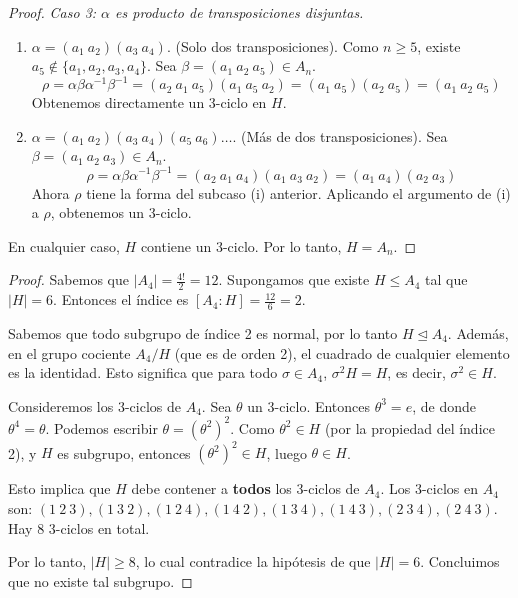 \begin{proof}
    \textit{Caso 3: $\alpha$ es producto de transposiciones disjuntas.}
    \begin{enumerate}
        \item[i)] $\alpha = (a_1 \ a_2)(a_3 \ a_4)$. (Solo dos transposiciones).
        Como $n \ge 5$, existe $a_5 \notin \{a_1, a_2, a_3, a_4\}$.
        Sea $\beta = (a_1 \ a_2 \ a_5) \in A_n$.
        \begin{equation*}
            \rho = \alpha \beta \alpha^{-1} \beta^{-1} = (a_2 \ a_1 \ a_5)(a_1 \ a_5 \ a_2) = (a_1 \ a_5)(a_2 \ a_5) = (a_1 \ a_2 \ a_5)
        \end{equation*}
        Obtenemos directamente un 3-ciclo en $H$.

        \item[ii)] $\alpha = (a_1 \ a_2)(a_3 \ a_4)(a_5 \ a_6) \dots$. (Más de dos transposiciones).
        Sea $\beta = (a_1 \ a_2 \ a_3) \in A_n$.
        \begin{equation*}
            \rho = \alpha \beta \alpha^{-1} \beta^{-1} = (a_2 \ a_1 \ a_4)(a_1 \ a_3 \ a_2) = (a_1 \ a_4)(a_2 \ a_3)
        \end{equation*}
        Ahora $\rho$ tiene la forma del subcaso (i) anterior. Aplicando el argumento de (i) a $\rho$, obtenemos un 3-ciclo.
    \end{enumerate}

    En cualquier caso, $H$ contiene un 3-ciclo. Por lo tanto, $H = A_n$.
\end{proof}


\begin{proof}
    Sabemos que $|A_4| = \frac{4!}{2} = 12$.
    Supongamos que existe $H \leq A_4$ tal que $|H| = 6$.
    Entonces el índice es $[A_4 : H] = \frac{12}{6} = 2$.
    
    Sabemos que todo subgrupo de índice 2 es normal, por lo tanto $H \trianglelefteq A_4$.
    Además, en el grupo cociente $A_4/H$ (que es de orden 2), el cuadrado de cualquier elemento es la identidad. Esto significa que para todo $\sigma \in A_4$, $\sigma^2 H = H$, es decir, $\sigma^2 \in H$.
    
    Consideremos los 3-ciclos de $A_4$. Sea $\theta$ un 3-ciclo.
    Entonces $\theta^3 = e$, de donde $\theta^4 = \theta$.
    Podemos escribir $\theta = (\theta^2)^2$.
    Como $\theta^2 \in H$ (por la propiedad del índice 2), y $H$ es subgrupo, entonces $(\theta^2)^2 \in H$, luego $\theta \in H$.
    
    Esto implica que $H$ debe contener a \textbf{todos} los 3-ciclos de $A_4$.
    Los 3-ciclos en $A_4$ son:
    $(1 \ 2 \ 3), (1 \ 3 \ 2), (1 \ 2 \ 4), (1 \ 4 \ 2), (1 \ 3 \ 4), (1 \ 4 \ 3), (2 \ 3 \ 4), (2 \ 4 \ 3)$.
    Hay 8 3-ciclos en total.
    
    Por lo tanto, $|H| \ge 8$, lo cual contradice la hipótesis de que $|H| = 6$.
    Concluimos que no existe tal subgrupo.
\end{proof}

